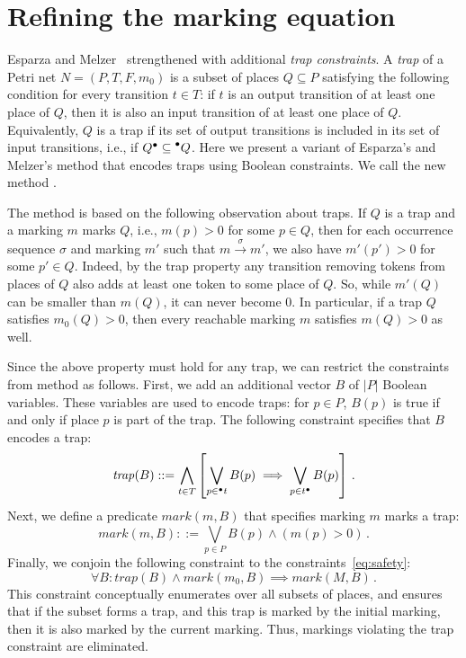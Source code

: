 \section{Refining the marking equation}
\label{sec:refining_the_marking_equation}

Esparza and Melzer~\cite{EsparzaMelzer00} 
strengthened \safety{} with additional
\emph{trap constraints}. A \emph{trap} of a Petri net $N=(P, T, F, m_0)$ is a subset of places
$Q \subseteq P$ satisfying the following condition for every
transition $t \in T$: if $t$ is an output transition of at least one
place of $Q$, then it is also an input transition of at least one
place of $Q$. Equivalently, $Q$ is a trap if its set of output
transitions is included in its set of input transitions, i.e., if
$Q^{\bullet} \subseteq \prescript{\bullet}{}{Q}$. Here we present a variant of Esparza's and
Melzer's method that encodes traps using Boolean constraints. We
call the new method \safetyref{}.

The method \safetyref{} is based on the following observation about traps.
If $Q$ is a trap and a marking $m$ marks $Q$, i.e., $m(p) > 0$ for some $p\in Q$,
then for each occurrence sequence $\sigma$ and marking $m'$ such that $m \xrightarrow{\sigma} m'$,
we also have $m'(p') > 0$ for some $p'\in Q$.  
Indeed, by the trap property any transition removing tokens from places of
$Q$ also adds at least one token to some place of $Q$. 
So, while $m'(Q)$ can be smaller than $m(Q)$, it can never become $0$. 
In particular, if a trap $Q$ satisfies $m_0(Q) > 0$, then every
reachable marking $m$ satisfies $m(Q) > 0$ as well.

Since the above property must hold for any trap, we can restrict the constraints
from method \safety{} as follows.
First, we add an additional vector $B$ of $|P|$ Boolean variables.
These variables are used to encode traps: for $p\in P$, $B(p)$ is true
if and only if place $p$ is part of the trap.
The following constraint specifies that $B$ encodes a trap:
\[
\mathit{trap}(B) ::= \bigwedge_{t\in T}\left[ \bigvee_{p \in \prescript{\bullet}{}{t}} B(p)
\implies \bigvee_{p\in t^{\bullet}} B(p) \right]\,.
\]
Next, we define a predicate $\mathit{mark}(m, B)$ that specifies marking $m$ marks a trap:
\[
\mathit{mark}(m, B) ::= \bigvee_{p\in P} B(p)\wedge (m(p) > 0)\,.
\]
Finally, we conjoin the following constraint to the constraints~\eqref{eq:safety}: 
\begin{equation}\label{eq:trap}
\forall B: \mathit{trap}(B) \wedge \mathit{mark}(m_0, B) \implies
\mathit{mark}(M, B)\,.
\end{equation}
%
This constraint conceptually enumerates over all subsets of places, and ensures that if
the subset forms a trap, and this trap is marked by the initial marking, then
it is also marked by the current marking. 
Thus, markings violating the trap constraint are eliminated.

